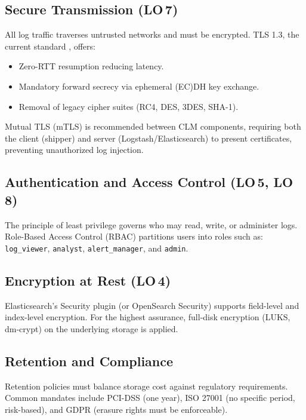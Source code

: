 \documentclass[12pt,a4paper]{report}
\begin{document}
\subsection{Secure Transmission (LO\,7)}

All log traffic traverses untrusted networks and must be encrypted.
TLS 1.3, the current standard \cite{rfc8446}, offers:
\begin{itemize}[leftmargin=1.5em]
    \item Zero-RTT resumption reducing latency.
    \item Mandatory forward secrecy via ephemeral (EC)DH key exchange.
    \item Removal of legacy cipher suites (RC4, DES, 3DES, SHA-1).
\end{itemize}

Mutual TLS (mTLS) is recommended between CLM components, requiring both the client
(shipper) and server (Logstash/Elasticsearch) to present certificates, preventing
unauthorized log injection.

\subsection{Authentication and Access Control (LO\,5, LO\,8)}

The principle of least privilege governs who may read, write, or administer logs.
Role-Based Access Control (RBAC) partitions users into roles such as:
\texttt{log\_viewer}, \texttt{analyst}, \texttt{alert\_manager}, and \texttt{admin}.

\subsection{Encryption at Rest (LO\,4)}

Elasticsearch's Security plugin (or OpenSearch Security) supports field-level and
index-level encryption.
For the highest assurance, full-disk encryption (LUKS, dm-crypt) on the underlying storage
is applied.

\subsection{Retention and Compliance}

Retention policies must balance storage cost against regulatory requirements.
Common mandates include PCI-DSS (one year), ISO 27001 (no specific period, risk-based),
and GDPR (erasure rights must be enforceable).


\end{document}
